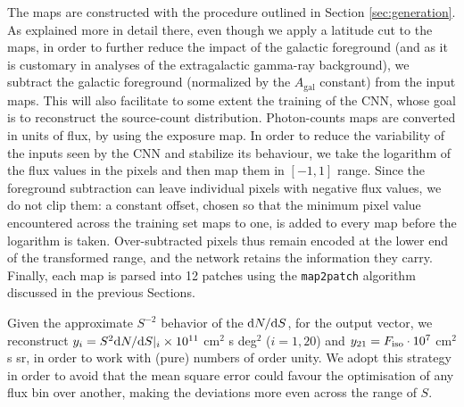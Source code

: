 The maps are constructed with the procedure outlined in Section \ref{sec:generation}. As explained more in detail there, even though we apply a latitude cut to the maps, in order to further reduce the impact of the galactic foreground (and as it is customary in analyses of the extragalactic gamma-ray background), we subtract the galactic foreground (normalized by the $A_\textrm{gal}$ constant) from the input maps. This will also facilitate to some extent the training of the CNN, whose goal is to reconstruct the source-count distribution. Photon-counts maps are converted in units of flux, by using the exposure map. In order to reduce the variability of the inputs seen by the CNN and stabilize its behaviour, we take the logarithm of the flux values in the pixels and then map them in $[-1,1]$ range.
Since the foreground subtraction can leave individual pixels with negative flux values, we do not clip them: a constant offset, chosen so that the minimum pixel value encountered across the training set maps to one, is added to every map before the logarithm is taken. Over-subtracted pixels thus remain encoded at the lower end of the transformed range, and the network retains the information they carry.
Finally, each map is parsed into 12 patches using the \verb|map2patch| algorithm discussed in the previous Sections.

Given the approximate $S^{-2}$ behavior of the $\text{d}N/\text{d}S$, for the output vector, we reconstruct $y_i = S^2 \text{d}N/\text{d}S|_i \times 10^{11}$ cm$^{2}$ s deg$^{2}$ ($i=1,20$) and $y_{21}=F_{\text{iso}} \cdot  10^{7}$ cm$^{2}$ s sr, in order to work with (pure) numbers of order unity. We adopt this strategy in order to avoid that the mean square error could favour the optimisation of any flux bin over another, making the deviations more even across the range of $S$.


